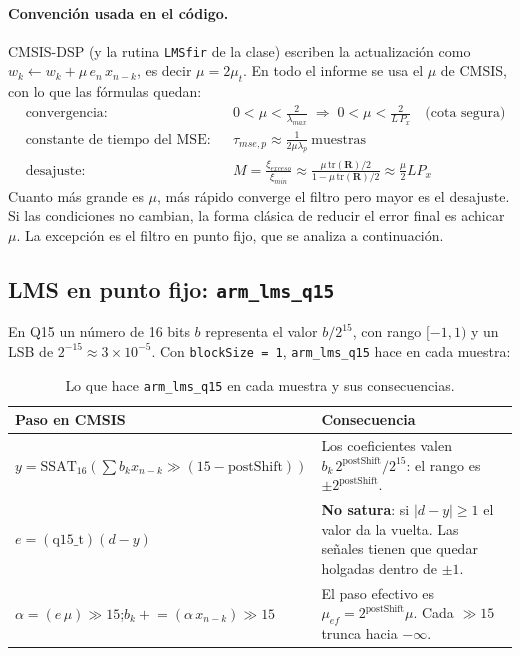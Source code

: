 \documentclass[11pt,a4paper]{article}
\newcommand{\lmsq}{\texttt{arm\_lms\_q15}}
\begin{document}
\paragraph{Convención usada en el código.} CMSIS-DSP (y la rutina \texttt{LMSfir} de la clase)
escriben la actualización como $w_k \leftarrow w_k + \mu\, e_n\, x_{n-k}$, es decir
$\mu = 2\mu_t$. En todo el informe se usa el $\mu$ de CMSIS, con lo que las fórmulas quedan:
\begin{align}
  &\text{convergencia:} && 0 < \mu < \frac{2}{\lambda_{max}} \;\Rightarrow\; 0<\mu<\frac{2}{L\,P_x}
  \quad\text{(cota segura)}\label{eq:mumax}\\
  &\text{constante de tiempo del MSE:} && \tau_{mse,p} \approx \frac{1}{2\mu\lambda_p}\ \text{muestras}\label{eq:tau}\\
  &\text{desajuste:} && M = \frac{\xi_{exceso}}{\xi_{min}} \approx \frac{\mu\,\mathrm{tr}(\mathbf{R})/2}{1-\mu\,\mathrm{tr}(\mathbf{R})/2}
  \approx \frac{\mu}{2} L P_x \label{eq:M}
\end{align}
Cuanto más grande es $\mu$, más rápido converge el filtro pero mayor es el desajuste. Si las
condiciones no cambian, la forma clásica de reducir el error final es achicar $\mu$. La
excepción es el filtro en punto fijo, que se analiza a continuación.

\subsection{LMS en punto fijo: \texorpdfstring{\texttt{arm\_lms\_q15}}{arm\_lms\_q15}}\label{sec:q15}
En Q15 un número de 16 bits $b$ representa el valor $b/2^{15}$, con rango $[-1, 1)$ y un
LSB de $2^{-15} \approx 3\times10^{-5}$. Con \texttt{blockSize = 1}, \lmsq{} hace en cada
muestra:
\begin{table}[H]
\centering
\caption{Lo que hace \lmsq{} en cada muestra y sus consecuencias.}
\label{tab:q15}
\small
\begin{tabular}{p{6.8cm}p{8cm}}
\toprule
Paso en CMSIS & Consecuencia \\
\midrule
$y = \mathrm{SSAT}_{16}\!\left(\sum b_k x_{n-k} \gg (15 - \mathrm{postShift})\right)$ &
Los coeficientes valen $b_k\,2^{\mathrm{postShift}}/2^{15}$: el rango es $\pm2^{\mathrm{postShift}}$. \\
$e = (\text{q15\_t})(d - y)$ & \textbf{No satura}: si $|d-y| \ge 1$ el valor da la vuelta. Las
señales tienen que quedar holgadas dentro de $\pm1$. \\
$\alpha = (e\,\mu) \gg 15$;\quad $b_k \mathrel{+}= (\alpha\, x_{n-k}) \gg 15$ &
El paso efectivo es $\mu_{ef} = 2^{\mathrm{postShift}}\mu$. Cada $\gg 15$ trunca hacia
$-\infty$. \\
\bottomrule
\end{tabular}
\end{table}
\end{document}
